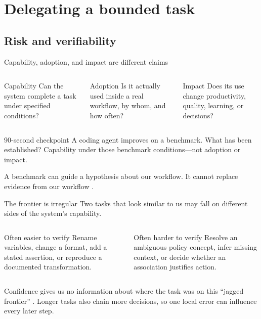 \section{Delegating a bounded task}
\subsection{Risk and verifiability}

\begin{frame}{Capability, adoption, and impact are different claims}
  \begin{columns}[T,onlytextwidth]
      \begin{block}{Capability}
        Can the system complete a task under specified conditions?
      \end{block}
      \begin{block}{Adoption}
        Is it actually used inside a real workflow, by whom, and how often?
      \end{block}
      \begin{block}{Impact}
        Does its use change productivity, quality, learning, or decisions?
      \end{block}
  \end{columns}

  \vspace{0.7em}
  \begin{block}{90-second checkpoint}
    A coding agent improves on a benchmark. What has been established?
    \alert{Capability under those benchmark conditions---not adoption or impact.}
  \end{block}

  \vfill
  A benchmark can guide a hypothesis about our workflow. It cannot replace
  evidence from our workflow \citep{metr2025}.
\end{frame}

\begin{frame}{The frontier is irregular}
  Two tasks that look similar to us may fall on different sides of the system's
  capability.

  \begin{columns}[T,onlytextwidth]
      \begin{block}{Often easier to verify}
        Rename variables, change a format, add a stated assertion, or reproduce
        a documented transformation.
      \end{block}
      \begin{block}{Often harder to verify}
        Resolve an ambiguous policy concept, infer missing context, or decide
        whether an association justifies action.
      \end{block}
  \end{columns}

  \vfill
  Confidence gives us no information about where the task was on this ``jagged
  frontier'' \citep{dellacqua2026}. Longer tasks also chain more decisions, so
  one local error can influence every later step.
\end{frame}


